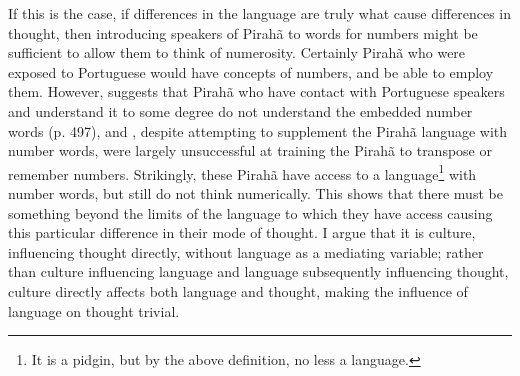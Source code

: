 \documentclass[doc,12pt]{apa6}
\begin{document}
If this is the case, if differences in the language are truly what cause differences 
in thought, then introducing speakers of Pirahã to words for numbers might be sufficient 
to allow them to think of numerosity. Certainly Pirah\~{a} who were exposed to Portuguese 
would have concepts of numbers, and be able to employ them. However,  
suggests that Pirah\~{a} who have contact with Portuguese speakers and understand it to 
some degree do not understand the embedded number words (p. 497), and , 
despite attempting to supplement the Pirah\~{a} language with number words, were largely 
unsuccessful at training the Pirah\~{a} to transpose or remember numbers. 
Strikingly, these Pirah\~{a} have access to a language\footnote{It is a pidgin, but by 
the above definition, no less a language.} with number words, but still do not think 
numerically. 
This shows that there must be something beyond the limits of the language to which they 
have access causing this particular difference in their mode of thought. I argue that 
it is culture, influencing thought directly, without language as a mediating variable; 
rather than culture influencing language and language subsequently influencing thought, 
culture directly affects both language and thought, making the influence of language on 
thought trivial.
\end{document}
